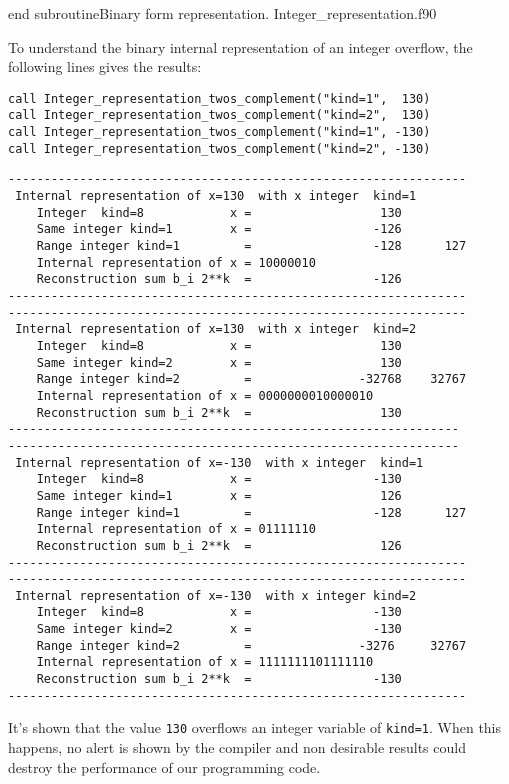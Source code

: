 \vspace{0.5cm}
{end subroutine}{Binary form representation. Integer_representation.f90}


To understand the binary internal representation of an integer overflow, 
the following lines gives the results: 
\begin{verbatim} 
call Integer_representation_twos_complement("kind=1",  130)
call Integer_representation_twos_complement("kind=2",  130)
call Integer_representation_twos_complement("kind=1", -130)
call Integer_representation_twos_complement("kind=2", -130)
\end{verbatim} 

\begin{verbatim} 
----------------------------------------------------------------
 Internal representation of x=130  with x integer  kind=1
    Integer  kind=8            x =                  130
    Same integer kind=1        x =                 -126
    Range integer kind=1         =                 -128      127
    Internal representation of x = 10000010
    Reconstruction sum b_i 2**k  =                 -126
----------------------------------------------------------------
----------------------------------------------------------------
 Internal representation of x=130  with x integer  kind=2
    Integer  kind=8            x =                  130
    Same integer kind=2        x =                  130
    Range integer kind=2         =               -32768    32767
    Internal representation of x = 0000000010000010
    Reconstruction sum b_i 2**k  =                  130
---------------------------------------------------------------
---------------------------------------------------------------
 Internal representation of x=-130  with x integer  kind=1
    Integer  kind=8            x =                 -130
    Same integer kind=1        x =                  126
    Range integer kind=1         =                 -128      127
    Internal representation of x = 01111110
    Reconstruction sum b_i 2**k  =                  126
----------------------------------------------------------------
----------------------------------------------------------------
 Internal representation of x=-130  with x integer kind=2
    Integer  kind=8            x =                 -130
    Same integer kind=2        x =                 -130
    Range integer kind=2         =               -3276     32767
    Internal representation of x = 1111111101111110
    Reconstruction sum b_i 2**k  =                 -130
----------------------------------------------------------------
\end{verbatim} 
It's shown that the value \texttt{130} overflows an integer variable of \texttt{kind=1}.
When this happens, no alert is shown by the compiler and non desirable results could destroy 
the performance of our programming code.    



